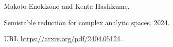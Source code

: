 Makoto Enokizono and Kenta Hashizume.

\newblock Semistable reduction for complex analytic spaces, 2024.

\newblock URL \url{https://arxiv.org/pdf/2404.05124}.

